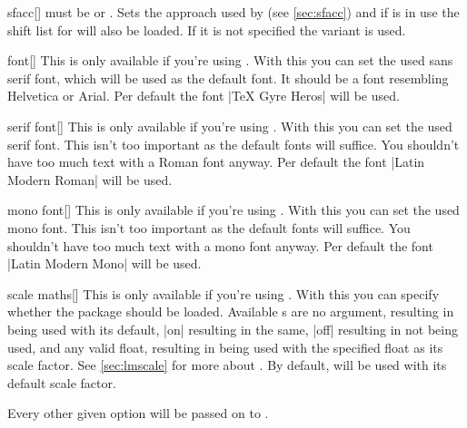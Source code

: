 \begin{describeopt}{sfacc}[]
   must be  or . Sets the approach used by
   (see \autoref{sec:sfacc}) and if  is in use the shift
  list for  will also be loaded. If it is not specified the
   variant is used.
\end{describeopt}
\begin{describeopt}{font}[]
  This is only available if you're using \luaxetex. With this you can set the
  used sans serif font, which will be used as the default font. It should be
  a font resembling Helvetica or Arial. Per default the font
  \bverb|TeX Gyre Heros| will be used.
\end{describeopt}
\begin{describeopt}{serif font}[]
  This is only available if you're using \luaxetex. With this you can set the
  used serif font. This isn't too important as the default fonts will suffice.
  You shouldn't have too much text with a Roman font anyway. Per default the
  font \bverb|Latin Modern Roman| will be used.
\end{describeopt}
\begin{describeopt}{mono font}[]
  This is only available if you're using \luaxetex. With this you can set the
  used mono font. This isn't too important as the default fonts will suffice.
  You shouldn't have too much text with a mono font anyway. Per default the
  font \bverb|Latin Modern Mono| will be used.
\end{describeopt}
\begin{describeopt}{scale maths}[]
  This is only available if you're using . With this you can
  specify whether the  package should be loaded. Available
  s are no argument, resulting in  being used with
  its default, |on| resulting in the same, |off| resulting in 
  not being used, and any valid float, resulting in  being used
  with the specified float as its scale factor. See \autoref{sec:lmscale} for
  more about . By default,  will be used with
  its default scale factor.
\end{describeopt}

\noindent
Every other given option will be passed on to .
